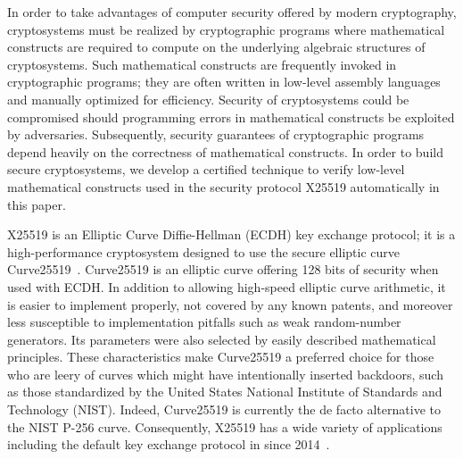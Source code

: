 
In order to take advantages of computer security offered by modern 
cryptography, 
cryptosystems must be realized by cryptographic programs where mathematical
constructs are required to compute on the underlying algebraic
structures of cryptosystems.
Such mathematical constructs are frequently invoked in cryptographic
programs; they are often written in low-level assembly languages and
manually optimized for efficiency. 
Security of cryptosystems could be compromised should programming
errors in mathematical constructs be exploited by adversaries.
Subsequently, security guarantees of cryptographic programs
depend heavily on the correctness of mathematical constructs.
In order to build secure cryptosystems, we develop a certified
technique to verify low-level mathematical constructs used in the
security protocol X25519 automatically in this paper.

X25519 is an Elliptic Curve Diffie-Hellman (ECDH) key exchange
protocol; it is a high-performance cryptosystem designed to 
use the secure elliptic curve Curve25519~\cite{Ber06}. Curve25519 is an elliptic
curve offering 128 bits of security when used with ECDH. In addition
to allowing high-speed elliptic curve arithmetic, it is easier to
implement properly, not covered by any known patents, and moreover
less susceptible to implementation pitfalls such as weak 
random-number generators. Its parameters were also selected by
easily described mathematical principles.
These characteristics make Curve25519 a
preferred choice for those who are leery of curves which might have
intentionally inserted
backdoors, such as those standardized by the United States National
Institute of Standards and Technology (NIST). 
Indeed, Curve25519 is currently the
de facto alternative to the NIST P-256 curve. Consequently, X25519 has
a wide variety of applications including the default key exchange
protocol in \openssh since 2014~\cite{W:17:C}.

